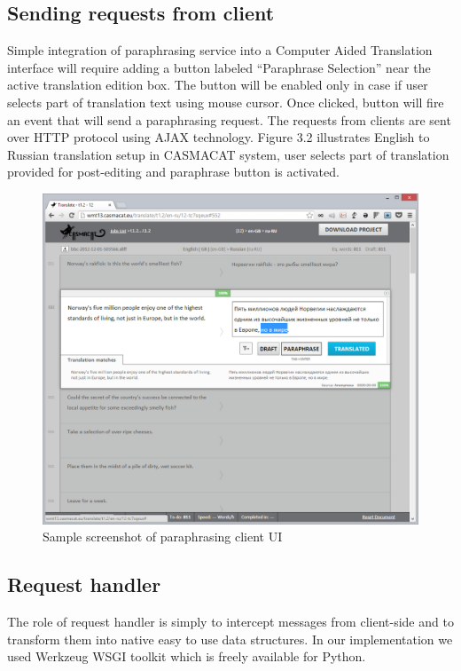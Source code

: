 \subsection{Sending requests from client}

Simple integration of paraphrasing service into a Computer Aided Translation interface will require adding a button labeled ``Paraphrase Selection'' near the active translation edition box. The button will be enabled only in case if user selects part of translation text using mouse cursor. Once clicked, button will fire an event that will send a paraphrasing request. The requests from clients are sent over HTTP protocol using AJAX technology. Figure 3.2 illustrates English to Russian translation setup in CASMACAT system, user selects part of translation provided for post-editing and paraphrase button is activated.

\begin{figure}
 \centering
 \includegraphics[scale=0.5]{g/screenshot.png}
 \caption{Sample screenshot of paraphrasing client UI}
\end{figure}

\subsection{Request handler}

The role of request handler is simply to intercept messages from client-side and to transform them into native easy to use data structures. In our implementation we used Werkzeug WSGI toolkit which is freely available for Python.

